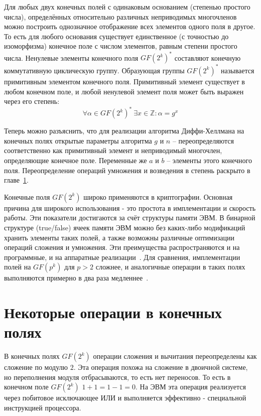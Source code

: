 \documentclass[times,specification,annotation]{itmo-student-thesis}
\begin{document}
Для любых двух конечных полей с одинаковым основанием (степенью простого числа), определённых относительно различных
неприводимых многочленов можно построить однозначное отображение всех элементов одного поля в другое.
То есть для любого основания существует единственное (с точностью до изоморфизма) конечное поле с числом
элементов, равным степени простого числа.
Ненулевые элементы конечного поля $GF(2^k)^*$ составляют конечную коммутативную циклическую группу.
Образующая группы $GF(2^k)^*$ называется примитивным элементом конечного поля.
Примитивный элемент существует в любом конечном поле, и любой ненулевой элемент поля может быть выражен через его степень:
\[\forall \alpha \in GF(2^k)^* ~ \exists x \in \mathbb{Z}: \alpha = g^x\]

Теперь можно разъяснить, что для реализации алгоритма Диффи-Хеллмана на конечных полях открытые параметры алгоритма
$g$ и $n$ -- переопределяются соответственно как примитивный элемент и неприводимый многочлен, определяющие конечное поле.
Переменные же $a$ и $b$ -- элементы этого конечного поля.
Переопределение операций умножения и возведения в степень раскрыто в главе~\ref{sec:oper}.

Конечные поля $GF(2^k)$ широко применяются в криптографии.
Основная причина для широкого использования - это простота в имплементации и скорость работы.
Эти показатели достигаются за счёт структуры памяти ЭВМ.
В бинарной структуре (true/false) ячеек памяти ЭВМ можно без каких-либо модификаций хранить элементы
таких полей, а также возможны различные оптимизации операций сложения и умножения.
Эти преимущества распространяются и на программные, и на аппаратные реализации~\cite{koc98}.
Для сравнения, имплементации полей на $GF(p^k)$ для $p > 2$ сложнее, и аналогичные операции в таких полях выполняются
примерно в два раза медленнее~\cite{mau15}.


\section{Некоторые операции в конечных полях}\label{sec:oper}

В конечных полях $GF(2^k)$ операции сложения и вычитания переопределены как сложение по модулю $2$.
Эта операция похожа на сложение в двоичной системе, но переполнения модуля отбрасываются, то есть нет переносов.
То есть в конечном поле $GF(2^k)$ $1+1 = 1-1 = 0$.
На ЭВМ эта операция реализуется через побитовое исключающее ИЛИ и выполняется эффективно - специальной инструкцией процессора.
\end{document}
